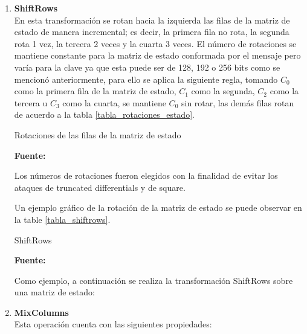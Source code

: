 \documentclass[../main/main.tex]{subfiles}
\begin{document}
\begin{enumerate}[label=\textbf{\arabic*}.]
        \item \textbf{ShiftRows} \\
          En esta transformación se rotan hacia la izquierda las filas de la matriz de estado de manera incremental; es decir, la primera fila no rota, la segunda rota 1 vez, la tercera 2 veces y la cuarta 3 veces. El número de rotaciones se mantiene constante para la matriz de estado conformada por el mensaje pero varía para la clave ya que esta puede ser de 128, 192 o 256 bits como se mencionó anteriormente, para ello se aplica la siguiente regla, tomando $C_0$ como la primera fila de la matriz de estado, $C_1$ como la segunda, $C_2$ como la tercera u $C_3$ como la cuarta, se mantiene $C_0$ sin rotar, las demás filas rotan de acuerdo a la tabla \ref{tabla_rotaciones_estado}.

          \begin{table}[H]
            \centering
            \caption{Rotaciones de las filas de la matriz de estado}
            
            \caption*{\textbf{Fuente:} \cite{report:seguridad_europea_eeuu}}
            \label{tabla_rotaciones_estado}
          \end{table}

          Los números de rotaciones fueron elegidos con la finalidad de evitar los ataques de truncated differentials y de square.

          Un ejemplo gráfico de la rotación de la matriz de estado se puede observar en la table \ref{tabla_shiftrows}.

          \begin{table}[H]
            \centering
            \caption{ShiftRows}
            
            \caption*{\textbf{Fuente:} \cite{report:seguridad_europea_eeuu}}
            \label{tabla_shiftrows}
          \end{table}

          Como ejemplo, a continuación se realiza la transformación ShiftRows sobre una matriz de estado:

          \begin{table}[H]
            \centering
            
          \end{table}

        \item \textbf{MixColumns} \\
          Esta operación cuenta con las siguientes propiedades:


\end{enumerate}
\end{document}
